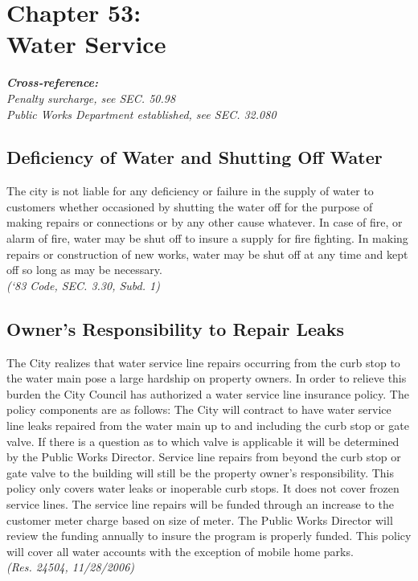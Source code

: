 \chapter*{Chapter 53: \\
	Water Service}
    \minitoc
    \textbf{\emph{{Cross-reference:}}}\\
    \emph{Penalty surcharge, see SEC. 50.98}\\
    \emph{Public Works Department established, see SEC. 32.080}
    \pagebreak

\section{Deficiency of Water and Shutting Off Water}
The city is not liable for any deficiency or failure in the supply of water to customers whether occasioned by shutting the water off for the purpose of making repairs or connections or by any other cause whatever.  In case of fire, or alarm of fire, water may be shut off to insure a supply for fire fighting.  In making repairs or construction of new works, water may be shut off at any time and kept off so long as may be necessary.\\
\emph{(‘83 Code, SEC. 3.30, Subd. 1)}
\section{Owner's Responsibility to Repair Leaks}
The City realizes that water service line repairs occurring from the curb stop to the water main pose a large hardship on property owners.  In order to relieve this burden the City Council has authorized a water service line insurance policy.  The policy components are as follows:  The City will contract to have water service line leaks repaired from the water main up to and including the curb stop or gate valve.  If there is a question as to which valve is applicable it will be determined by the Public Works Director. Service line repairs from beyond the curb stop or gate valve to the building will still be the property owner’s responsibility.  This policy only covers water leaks or inoperable curb stops.  It does not cover frozen service lines.  The service line repairs will be funded through an increase to the customer meter charge based on size of meter. The Public Works Director will review the funding annually to insure the program is properly funded.  This policy will cover all water accounts with the exception of mobile home parks.\\
\emph{(Res. 24504, 11/28/2006)}

